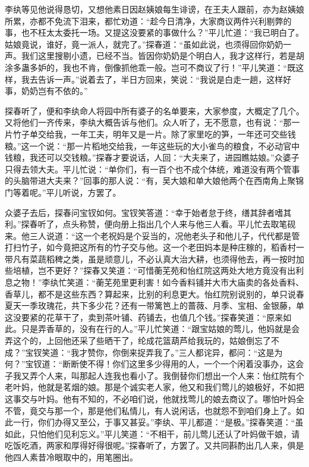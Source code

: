 \documentclass[12pt,oneside]{book}
\begin{document}
李纨等见他说得恳切，又想他素日因赵姨娘每生诽谤，在王夫人跟前，亦为赵姨娘所累，亦都不免流下泪来，都忙劝道：“趁今日清净，大家商议两件兴利剔弊的事，也不枉太太委托一场。又提这没要紧的事做什么？”平儿忙道：“我已明白了。姑娘竟说，谁好，竟一派人，就完了。”探春道：“虽如此说，也须得回你奶奶一声。我们这里搜剔小遗，已经不当。皆因你奶奶是个明白人，我才这样行，若是胡涂多蛊多妒的，我也不肯，倒像抓他乖一般。岂可不商议了行！”平儿笑道：“既这样，我去告诉一声。”说着去了，半日方回来，笑说：“我说是白走一趟，这样好事，奶奶岂有不依的。”

探春听了，便和李纨命人将园中所有婆子的名单要来，大家参度，大概定了几个。又将他们一齐传来，李纨大概告诉与他们。众人听了，无不愿意，也有说：“那一片竹子单交给我，一年工夫，明年又是一片。除了家里吃的笋，一年还可交些钱粮。”这一个说：“那一片稻地交给我，一年这些玩的大小雀鸟的粮食，不必动官中钱粮，我还可以交钱粮。”探春才要说话，人回：“大夫来了，进园瞧姑娘。”众婆子只得去领大夫。平儿忙说：“单你们，有一百个也不成个体统，难道没有两个管事的头脑带进大夫来？”回事的那人说：“有，吴大娘和单大娘他两个在西南角上聚锦门等着呢。”平儿听说，方罢了。

众婆子去后，探春问宝钗如何。宝钗笑答道：“幸于始者怠于终，缮其辞者嗜其利。”探春听了，点头称赞，便向册上指出几个人来与他三人看。平儿忙去取笔砚来。他三人说道：“这一个老祝妈是个妥当的，况他老头子和他儿子，代代都是管打扫竹子，如今竟把这所有的竹子交与他。这一个老田妈本是种庄稼的，稻香村一带凡有菜蔬稻稗之类，虽是顽意儿，不必认真大治大耕，也须得他去，再一按时加些培植，岂不更好？”探春又笑道：“可惜蘅芜苑和怡红院这两处大地方竟没有出利息之物！”李纨忙笑道：“蘅芜苑里更利害！如今香料铺并大市大庙卖的各处香料、香草儿，都不是这些东西？算起来，比别的利息更大。怡红院别说别的，单只说春夏天一季玫瑰花，共下多少花？还有一带篱笆上的蔷薇、月季、宝相、金银藤，单这没要紧的花草干了，卖到茶叶铺、药铺去，也值几个钱。”探春笑道：“原来如此。只是弄香草的，没有在行的人。”平儿忙笑道：“跟宝姑娘的莺儿，他妈就是会弄这个的，上回他还采了些晒干了，纶成花篮葫芦给我玩的，姑娘倒忘了不成？”宝钗笑道：“我才赞你，你倒来捉弄我了。”三人都诧异，都问：“这是为何？”宝钗道：“断断使不得！你们这里多少得用的人，一个一个闲着没事办，这会子我又弄个人来，叫那起人连我也看小了。我倒替你们想出一个人来：怡红院有个老叶妈，他就是茗烟的娘。那是个诚实老人家，他又和我们莺儿的娘极好，不如把这事交与叶妈。他有不知的，不必咱们说，他就找莺儿的娘去商议了。哪怕叶妈全不管，竟交与那一个，那是他们私情儿，有人说闲话，也就怨不到咱们身上了。如此一行，你们办得又至公，于事又甚妥。”李纨、平儿都道：“是极。”探春笑道：“虽如此，只怕他们见利忘义。”平儿笑道：“不相干，前儿莺儿还认了叶妈做干娘，请吃饭吃酒，两家和厚得好得很呢。”探春听了，方罢了。又共同斟酌出几人来，俱是他四人素昔冷眼取中的，用笔圈出。
\end{document}
